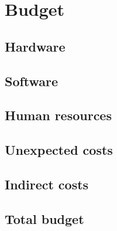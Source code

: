\section{Budget}
\subsection{Hardware}
\subsection{Software}
\subsection{Human resources}
\subsection{Unexpected costs}
\subsection{Indirect costs}
\subsection{Total budget}